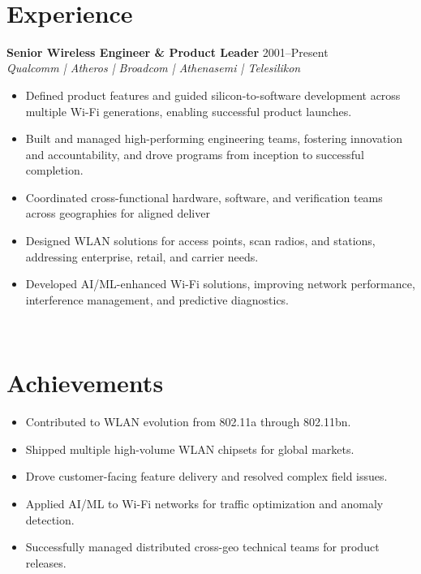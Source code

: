 \documentclass[a4paper,11pt]{article}
\begin{document}
\mbox{} \\

\section*{Experience}
\textbf{Senior Wireless Engineer \& Product Leader} \hfill 2001--Present \\
\textit{Qualcomm | Atheros | Broadcom | Athenasemi | Telesilikon} \\
\begin{itemize}
    \item Defined product features and guided silicon-to-software development across multiple Wi-Fi generations, enabling successful product launches.
    \item Built and managed high-performing engineering teams, fostering innovation and accountability, and drove programs from inception to successful completion.
    \item Coordinated cross-functional hardware, software, and verification teams across geographies for aligned deliver
    \item Designed WLAN solutions for access points, scan radios, and stations, addressing enterprise, retail, and carrier needs.
    \item Developed AI/ML-enhanced Wi-Fi solutions, improving network performance, interference management, and predictive diagnostics.
\end{itemize}

\mbox{} \\

\section*{Achievements}
\begin{itemize}
    \item Contributed to WLAN evolution from 802.11a through 802.11bn.
    \item Shipped multiple high-volume WLAN chipsets for global markets.
    \item Drove customer-facing feature delivery and resolved complex field issues.
    \item Applied AI/ML to Wi-Fi networks for traffic optimization and anomaly detection.
    \item Successfully managed distributed cross-geo technical teams for product releases.
\end{itemize}
\end{document}
